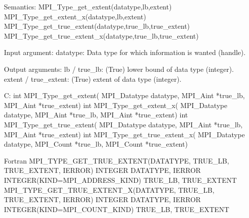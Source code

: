 Semantics:
MPI_Type_get_extent(datatype,lb,extent)
MPI_Type_get_extent_x(datatype,lb,extent)
MPI_Type_get_true_extent(datatype,true_lb,true_extent)
MPI_Type_get_true_extent_x(datatype,true_lb,true_extent)

Input argument:
datatype: Data type for which information is wanted (handle).

Output arguments:
lb / true_lb: (True) lower bound of data type (integer).
extent / true_extent: (True) extent of data type (integer).

C:
int MPI_Type_get_extent(
    MPI_Datatype datatype,
    MPI_Aint *true_lb, MPI_Aint *true_extent)
int MPI_Type_get_extent_x(
    MPI_Datatype datatype,
    MPI_Aint *true_lb, MPI_Aint *true_extent)
int MPI_Type_get_true_extent(
    MPI_Datatype datatype,
    MPI_Aint *true_lb, MPI_Aint *true_extent)
int MPI_Type_get_true_extent_x(
    MPI_Datatype datatype,
    MPI_Count *true_lb, MPI_Count *true_extent)

Fortran
MPI_TYPE_GET_TRUE_EXTENT(DATATYPE, TRUE_LB, TRUE_EXTENT, IERROR)
    INTEGER    DATATYPE, IERROR
    INTEGER(KIND=MPI_ADDRESS_KIND) TRUE_LB, TRUE_EXTENT
MPI_TYPE_GET_TRUE_EXTENT_X(DATATYPE, TRUE_LB, TRUE_EXTENT, IERROR)
    INTEGER    DATATYPE, IERROR
    INTEGER(KIND=MPI_COUNT_KIND) TRUE_LB, TRUE_EXTENT


